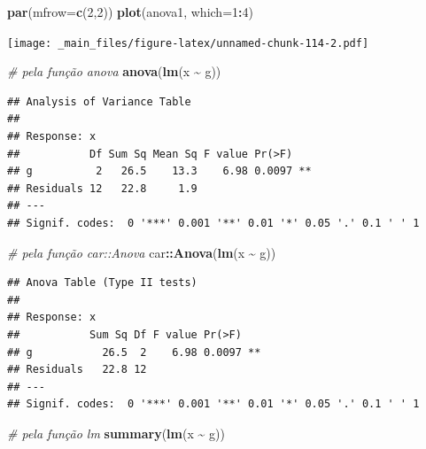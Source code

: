 \documentclass[
]{book}
\newenvironment{Shaded}{\begin{snugshade}}{\end{snugshade}}
\newcommand{\CommentTok}[1]{\textcolor[rgb]{0.56,0.35,0.01}{\textit{#1}}}
\newcommand{\DataTypeTok}[1]{\textcolor[rgb]{0.13,0.29,0.53}{#1}}
\newcommand{\DecValTok}[1]{\textcolor[rgb]{0.00,0.00,0.81}{#1}}
\newcommand{\KeywordTok}[1]{\textcolor[rgb]{0.13,0.29,0.53}{\textbf{#1}}}
\newcommand{\NormalTok}[1]{#1}
\newcommand{\OperatorTok}[1]{\textcolor[rgb]{0.81,0.36,0.00}{\textbf{#1}}}
\newcommand{\StringTok}[1]{\textcolor[rgb]{0.31,0.60,0.02}{#1}}
\theoremstyle{definition}
\theoremstyle{definition}
\theoremstyle{definition}
\theoremstyle{remark}
\begin{document}
\begin{Shaded}
\begin{Highlighting}[]
\KeywordTok{par}\NormalTok{(}\DataTypeTok{mfrow=}\KeywordTok{c}\NormalTok{(}\DecValTok{2}\NormalTok{,}\DecValTok{2}\NormalTok{))}
\KeywordTok{plot}\NormalTok{(anova1, }\DataTypeTok{which=}\DecValTok{1}\OperatorTok{:}\DecValTok{4}\NormalTok{)}
\end{Highlighting}
\end{Shaded}

\texttt{[image: \_main\_files/figure-latex/unnamed-chunk-114-2.pdf]}

\begin{Shaded}
\begin{Highlighting}[]
\CommentTok{\# pela função anova}
\KeywordTok{anova}\NormalTok{(}\KeywordTok{lm}\NormalTok{(x }\OperatorTok{\textasciitilde{}}\StringTok{ }\NormalTok{g))}
\end{Highlighting}
\end{Shaded}

\begin{verbatim}
## Analysis of Variance Table
## 
## Response: x
##           Df Sum Sq Mean Sq F value Pr(>F)   
## g          2   26.5    13.3    6.98 0.0097 **
## Residuals 12   22.8     1.9                  
## ---
## Signif. codes:  0 '***' 0.001 '**' 0.01 '*' 0.05 '.' 0.1 ' ' 1
\end{verbatim}

\begin{Shaded}
\begin{Highlighting}[]
\CommentTok{\# pela função car::Anova}
\NormalTok{car}\OperatorTok{::}\KeywordTok{Anova}\NormalTok{(}\KeywordTok{lm}\NormalTok{(x }\OperatorTok{\textasciitilde{}}\StringTok{ }\NormalTok{g))}
\end{Highlighting}
\end{Shaded}

\begin{verbatim}
## Anova Table (Type II tests)
## 
## Response: x
##           Sum Sq Df F value Pr(>F)   
## g           26.5  2    6.98 0.0097 **
## Residuals   22.8 12                  
## ---
## Signif. codes:  0 '***' 0.001 '**' 0.01 '*' 0.05 '.' 0.1 ' ' 1
\end{verbatim}

\begin{Shaded}
\begin{Highlighting}[]
\CommentTok{\# pela função lm}
\KeywordTok{summary}\NormalTok{(}\KeywordTok{lm}\NormalTok{(x }\OperatorTok{\textasciitilde{}}\StringTok{ }\NormalTok{g))}
\end{Highlighting}
\end{Shaded}
\end{document}
